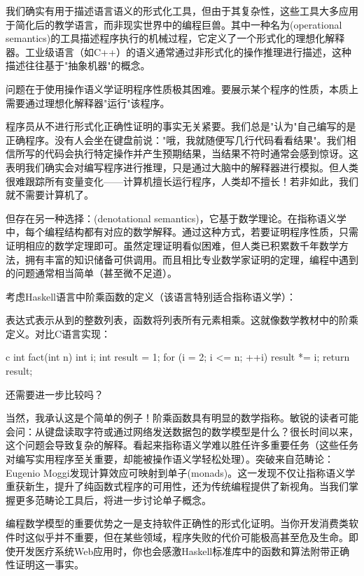 我们确实有用于描述语言语义的形式化工具，但由于其复杂性，这些工具大多应用于简化后的教学语言，而非现实世界中的编程巨兽。其中一种名为(operational semantics)的工具描述程序执行的机械过程，它定义了一个形式化的理想化解释器。工业级语言（如C++）的语义通常通过非形式化的操作推理进行描述，这种描述往往基于"抽象机器"的概念。

问题在于使用操作语义学证明程序性质极其困难。要展示某个程序的性质，本质上需要通过理想化解释器"运行"该程序。

程序员从不进行形式化正确性证明的事实无关紧要。我们总是"认为"自己编写的是正确程序。没有人会坐在键盘前说："哦，我就随便写几行代码看看结果"。我们相信所写的代码会执行特定操作并产生预期结果，当结果不符时通常会感到惊讶。这表明我们确实会对编写程序进行推理，只是通过大脑中的解释器进行模拟。但人类很难跟踪所有变量变化——计算机擅长运行程序，人类却不擅长！若非如此，我们就不需要计算机了。

但存在另一种选择：(denotational semantics)，它基于数学理论。在指称语义学中，每个编程结构都有对应的数学解释。通过这种方式，若要证明程序性质，只需证明相应的数学定理即可。虽然定理证明看似困难，但人类已积累数千年数学方法，拥有丰富的知识储备可供调用。而且相比专业数学家证明的定理，编程中遇到的问题通常相当简单（甚至微不足道）。

考虑Haskell语言中阶乘函数的定义（该语言特别适合指称语义学）：

表达式\code{{[}1..n{]}}表示从到的整数列表，函数将列表所有元素相乘。这就像数学教材中的阶乘定义。对比C语言实现：

\begin{snip}{c}
int fact(int n) {
    int i;
    int result = 1;
    for (i = 2; i <= n; ++i)
        result *= i;
    return result;
}
\end{snip}
还需要进一步比较吗？

当然，我承认这是个简单的例子！阶乘函数具有明显的数学指称。敏锐的读者可能会问：从键盘读取字符或通过网络发送数据包的数学模型是什么？很长时间以来，这个问题会导致复杂的解释。看起来指称语义学难以胜任许多重要任务（这些任务对编写实用程序至关重要，却能被操作语义学轻松处理）。突破来自范畴论：Eugenio Moggi发现计算效应可映射到单子(monads)。这一发现不仅让指称语义学重获新生，提升了纯函数式程序的可用性，还为传统编程提供了新视角。当我们掌握更多范畴论工具后，将进一步讨论单子概念。

编程数学模型的重要优势之一是支持软件正确性的形式化证明。当你开发消费类软件时这似乎并不重要，但在某些领域，程序失败的代价可能极高甚至危及生命。即使开发医疗系统Web应用时，你也会感激Haskell标准库中的函数和算法附带正确性证明这一事实。

